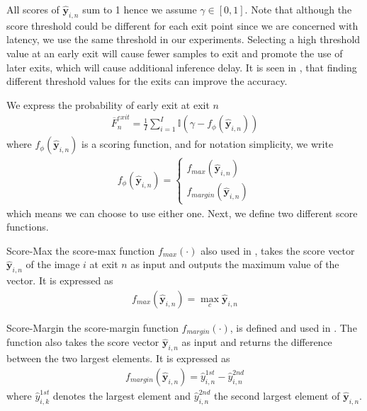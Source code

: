 \begin{enumdescript}
	All scores of  $ \bm{\hat{y}}_{i,n} $ sum to 1 hence we assume $	\gamma \in \left[0,1\right] $. Note that although the score threshold could be different for each exit point since we are concerned with latency, we use the same threshold in our experiments. Selecting a high threshold value at an early exit will cause fewer samples to exit and promote the use of later exits, which will cause additional inference delay. It is seen in \cite{teerapittayanon_finding_2018}, that finding different threshold values for the exits can improve the accuracy.
	
	We express the probability of early exit at exit $ n $		\begin{align}
	\overline{F}^{exit}_n = \frac{1}{I}\sum_{i=1}^{I} \mathbb{I} \left(\gamma-f_{\phi}\left(\bm{\hat{y}}_{i,n}\right) \right)
	\end{align}
	where $ f_\phi\left(\bm{\hat{y}}_{i,n}\right) $ is a scoring function, and for notation simplicity, we write 
	\begin{align}
	f_{\phi}\left(\bm{\hat{y}}_{i,n}\right) = \begin{cases}
	f_{max}\left(\bm{\hat{y}}_{i,n}\right)\\
	f_{margin}\left(\bm{\hat{y}}_{i,n}\right)
	\end{cases}
	\end{align}
	which means we can choose to use either one. Next, we define two different score functions.
	
	\begin{enumdescript}
		\item[Score-Max] the score-max function $ f_{max}(\cdot)$ also used in \cite{leroux_resource-constrained_2015}, takes the score vector $ \bm{\hat{y}}_{i,n} $ of the image $ i $ at exit $ n $ as input and outputs the maximum value of the vector. It is expressed as
		\begin{align}
		f_{max}\left(\bm{\hat{y}}_{i,n}\right) = \underset{c}{\max} \bm{\hat{y}}_{i,n}
		\end{align}
		\item[Score-Margin] the score-margin function $ f_{margin}(\cdot)$, is defined and used in \cite{park_big/little_2015}. The function also takes the score vector $ \bm{\hat{y}}_{i,n} $ as input and returns the difference between the two largest elements. It is expressed as
		\begin{align}
		f_{margin}\left(\bm{\hat{y}}_{i,n}\right) = \hat{y}_{i,n}^{1st} - \hat{y}_{i,n}^{2nd} \label{eq:f_margin}
		\end{align}
		where $ \hat{y}_{i,k}^{1st} $ denotes the largest element and $ \hat{y}_{i,n}^{2nd} $ the second largest element of $ \bm{\hat{y}}_{i,n} $.
		

\end{enumdescript}
\end{enumdescript}
